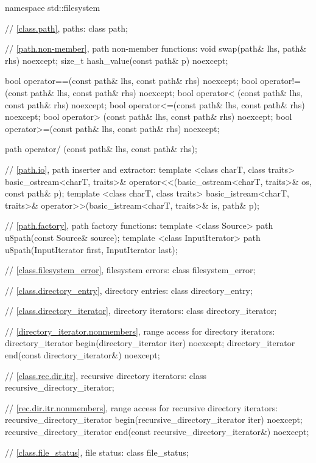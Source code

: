 \begin{codeblock}
namespace std::filesystem {
  // \ref{class.path}, paths:
  class path;

  // \ref{path.non-member}, path non-member functions:
  void swap(path& lhs, path& rhs) noexcept;
  size_t hash_value(const path& p) noexcept;

  bool operator==(const path& lhs, const path& rhs) noexcept;
  bool operator!=(const path& lhs, const path& rhs) noexcept;
  bool operator< (const path& lhs, const path& rhs) noexcept;
  bool operator<=(const path& lhs, const path& rhs) noexcept;
  bool operator> (const path& lhs, const path& rhs) noexcept;
  bool operator>=(const path& lhs, const path& rhs) noexcept;

  path operator/ (const path& lhs, const path& rhs);

  // \ref{path.io}, path inserter and extractor:
  template <class charT, class traits>
    basic_ostream<charT, traits>&
      operator<<(basic_ostream<charT, traits>& os, const path& p);
  template <class charT, class traits>
    basic_istream<charT, traits>&
      operator>>(basic_istream<charT, traits>& is, path& p);

  // \ref{path.factory}, path factory functions:
  template <class Source>
    path u8path(const Source& source);
  template <class InputIterator>
    path u8path(InputIterator first, InputIterator last);

  // \ref{class.filesystem_error}, filesystem errors:
  class filesystem_error;

  // \ref{class.directory_entry}, directory entries:
  class directory_entry;

  // \ref{class.directory_iterator}, directory iterators:
  class directory_iterator;

  // \ref{directory_iterator.nonmembers}, range access for directory iterators:
  directory_iterator begin(directory_iterator iter) noexcept;
  directory_iterator end(const directory_iterator&) noexcept;

  // \ref{class.rec.dir.itr}, recursive directory iterators:
  class recursive_directory_iterator;

  // \ref{rec.dir.itr.nonmembers}, range access for recursive directory iterators:
  recursive_directory_iterator begin(recursive_directory_iterator iter) noexcept;
  recursive_directory_iterator end(const recursive_directory_iterator&) noexcept;

  // \ref{class.file_status}, file status:
  class file_status;

}
\end{codeblock}
